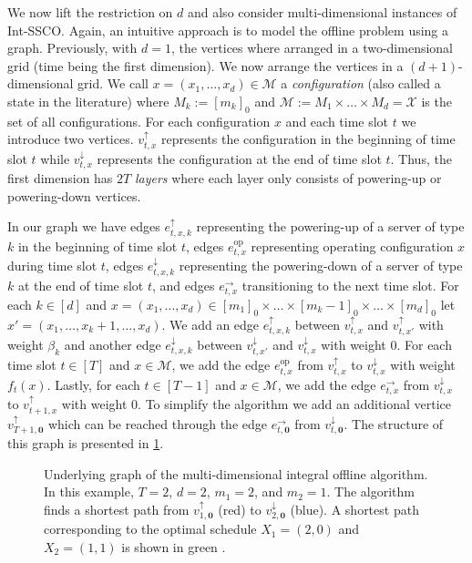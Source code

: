 We now lift the restriction on $d$ and also consider multi-dimensional instances of Int-SSCO. Again, an intuitive approach is to model the offline problem using a graph. Previously, with $d = 1$, the vertices where arranged in a two-dimensional grid (time being the first dimension). We now arrange the vertices in a $(d+1)$-dimensional grid. We call $x = (x_1, \dots, x_d) \in \mathcal{M}$ a \emph{configuration} (also called a state in the literature) where $M_k := [m_k]_0$ and $\mathcal{M} := M_1 \times \dots \times M_d = \mathcal{X}$ is the set of all configurations. For each configuration $x$ and each time slot $t$ we introduce two vertices. $v_{t,x}^{\uparrow}$ represents the configuration in the beginning of time slot $t$ while $v_{t,x}^{\downarrow}$ represents the configuration at the end of time slot $t$. Thus, the first dimension has $2 T$ \emph{layers} where each layer only consists of powering-up or powering-down vertices.

In our graph we have edges $e_{t,x,k}^{\uparrow}$ representing the powering-up of a server of type $k$ in the beginning of time slot $t$, edges $e_{t,x}^{\text{op}}$ representing operating configuration $x$ during time slot $t$, edges $e_{t,x,k}^{\downarrow}$ representing the powering-down of a server of type $k$ at the end of time slot $t$, and edges $e_{t,x}^{\rightarrow}$ transitioning to the next time slot. For each $k \in [d]$ and $x = (x_1, \dots, x_d) \in [m_1]_0 \times \dots \times [m_k - 1]_0 \times \dots \times [m_d]_0$ let $x' = (x_1, \dots, x_k + 1, \dots, x_d)$. We add an edge $e_{t,x,k}^{\uparrow}$ between $v_{t,x}^{\uparrow}$ and $v_{t,x'}^{\uparrow}$ with weight $\beta_k$ and another edge $e_{t,x,k}^{\downarrow}$ between $v_{t,x'}^{\downarrow}$ and $v_{t,x}^{\downarrow}$ with weight $0$. For each time slot $t \in [T]$ and $x \in \mathcal{M}$, we add the edge $e_{t,x}^{\text{op}}$ from $v_{t,x}^{\uparrow}$ to $v_{t,x}^{\downarrow}$ with weight $f_t(x)$. Lastly, for each $t \in [T-1]$ and $x \in \mathcal{M}$, we add the edge $e_{t,x}^{\rightarrow}$ from $v_{t,x}^{\downarrow}$ to $v_{t+1,x}^{\uparrow}$ with weight $0$.  To simplify the algorithm we add an additional vertice $v_{T+1,\mathbf{0}}^{\uparrow}$ which can be reached through the edge $e_{t,\mathbf{0}}^{\rightarrow}$ from $v_{t,\mathbf{0}}^{\downarrow}$. The structure of this graph is presented in \cref{fig:underlying_graph_of_the_multi_dimensional_integral_offline_algorithm}.

\begin{figure}
    \centering
    \resizebox{\textwidth}{!}{}
    \caption{Underlying graph of the multi-dimensional integral offline algorithm. In this example, $T = 2$, $d = 2$, $m_1 = 2$, and $m_2 = 1$. The algorithm finds a shortest path from $v_{1,\mathbf{0}}^{\uparrow}$ (red) to $v_{2,\mathbf{0}}^{\downarrow}$ (blue). A shortest path corresponding to the optimal schedule $X_1 = (2,0)$ and $X_2 = (1,1)$ is shown in green \cite{Albers2021_2}.}
    \label{fig:underlying_graph_of_the_multi_dimensional_integral_offline_algorithm}
\end{figure}


